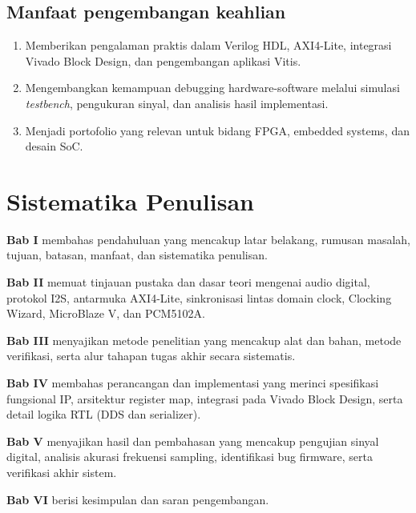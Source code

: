 \subsection{Manfaat pengembangan keahlian}
\begin{enumerate}
	\item Memberikan pengalaman praktis dalam Verilog HDL, AXI4-Lite, integrasi Vivado Block Design, dan pengembangan aplikasi Vitis.
	\item Mengembangkan kemampuan debugging hardware-software melalui simulasi \textit{testbench}, pengukuran sinyal, dan analisis hasil implementasi.
	\item Menjadi portofolio yang relevan untuk bidang FPGA, embedded systems, dan desain SoC.
\end{enumerate}

\section{Sistematika Penulisan}

\noindent\textbf{Bab I} membahas pendahuluan yang mencakup latar belakang, rumusan masalah, tujuan, batasan, manfaat, dan sistematika penulisan.

\noindent\textbf{Bab II} memuat tinjauan pustaka dan dasar teori mengenai audio digital, protokol I2S, antarmuka AXI4-Lite, sinkronisasi lintas domain clock, Clocking Wizard, MicroBlaze V, dan PCM5102A.

\noindent\textbf{Bab III} menyajikan metode penelitian yang mencakup alat dan bahan, metode verifikasi, serta alur tahapan tugas akhir secara sistematis.

\noindent\textbf{Bab IV} membahas perancangan dan implementasi yang merinci spesifikasi fungsional IP, arsitektur register map, integrasi pada Vivado Block Design, serta detail logika RTL (DDS dan serializer).

\noindent\textbf{Bab V} menyajikan hasil dan pembahasan yang mencakup pengujian sinyal digital, analisis akurasi frekuensi sampling, identifikasi bug firmware, serta verifikasi akhir sistem.

\noindent\textbf{Bab VI} berisi kesimpulan dan saran pengembangan.
